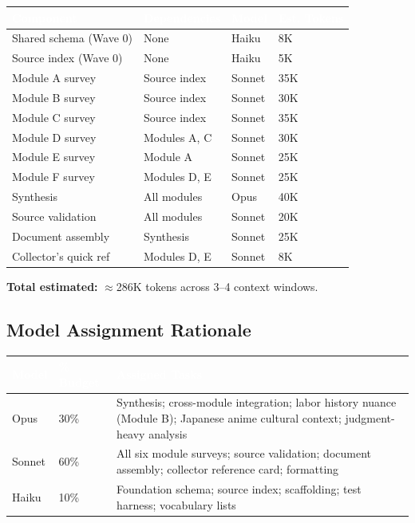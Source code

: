 \documentclass[11pt,letterpaper]{article}
\newcommand{\tableheader}[1]{\textbf{\sffamily\textcolor{white}{#1}}}
\begin{document}
\begin{center}
\begin{tabularx}{\textwidth}{L{3cm}L{2.5cm}C{2cm}C{2cm}}
\toprule
{}
\tableheader{Component} & \tableheader{Dependencies} & \tableheader{Model} & \tableheader{Est. Tokens} \\
\midrule
Shared schema (Wave 0) & None & Haiku & 8K \\
Source index (Wave 0) & None & Haiku & 5K \\
Module A survey & Source index & Sonnet & 35K \\
Module B survey & Source index & Sonnet & 30K \\
Module C survey & Source index & Sonnet & 35K \\
Module D survey & Modules A, C & Sonnet & 30K \\
Module E survey & Module A & Sonnet & 25K \\
Module F survey & Modules D, E & Sonnet & 25K \\
Synthesis & All modules & Opus & 40K \\
Source validation & All modules & Sonnet & 20K \\
Document assembly & Synthesis & Sonnet & 25K \\
Collector's quick ref & Modules D, E & Sonnet & 8K \\
\bottomrule
\end{tabularx}
\end{center}

\textbf{Total estimated:} $\approx$286K tokens across 3--4 context windows.

\subsection{Model Assignment Rationale}

\begin{center}
\begin{tabularx}{\textwidth}{L{2cm}C{1.5cm}X}
\toprule
{}
\tableheader{Model} & \tableheader{\% Budget} & \tableheader{Assigned Tasks} \\
\midrule
Opus & 30\% & Synthesis; cross-module integration; labor history nuance (Module B); Japanese anime cultural context; judgment-heavy analysis \\
Sonnet & 60\% & All six module surveys; source validation; document assembly; collector reference card; formatting \\
Haiku & 10\% & Foundation schema; source index; scaffolding; test harness; vocabulary lists \\
\bottomrule
\end{tabularx}
\end{center}
\end{document}
